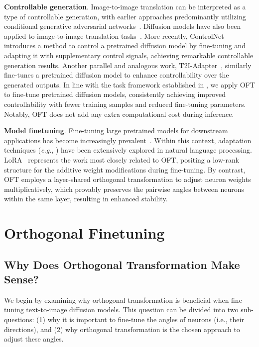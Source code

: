 \textbf{Controllable generation}. Image-to-image translation can be interpreted as a type of controllable generation, with earlier approaches predominantly utilizing conditional generative adversarial networks~\cite{isola2017image,zhu2017toward,wang2018high,park2019semantic,choi2018stargan}. Diffusion models have also been applied to image-to-image translation tasks~\cite{saharia2022palette,voynov2022sketch,wang2022pretraining}. More recently, ControlNet~\cite{zhang2023adding} introduces a method to control a pretrained diffusion model by fine-tuning and adapting it with supplementary control signals, achieving remarkable controllable generation results. Another parallel and analogous work, T2I-Adapter~\cite{mou2023t2i}, similarly fine-tunes a pretrained diffusion model to enhance controllability over the generated outputs. In line with the task framework established in \cite{zhang2023adding,mou2023t2i}, we apply OFT to fine-tune pretrained diffusion models, consistently achieving improved controllability with fewer training samples and reduced fine-tuning parameters. Notably, OFT does not add any extra computational cost during inference.

\textbf{Model finetuning}. Fine-tuning large pretrained models for downstream applications has become increasingly prevalent~\cite{devlin2018bert,brown2020language,he2022masked}. Within this context, adaptation techniques (\emph{e.g.}, \cite{hulora2022,houlsby2019parameter,pfeiffer2020adapterfusion}) have been extensively explored in natural language processing. LoRA~\cite{hulora2022} represents the work most closely related to OFT, positing a low-rank structure for the additive weight modifications during fine-tuning. By contrast, OFT employs a layer-shared orthogonal transformation to adjust neuron weights multiplicatively, which provably preserves the pairwise angles between neurons within the same layer, resulting in enhanced stability.

\section{Orthogonal Finetuning}

\subsection{Why Does Orthogonal Transformation Make Sense?}

We begin by examining why orthogonal transformation is beneficial when fine-tuning text-to-image diffusion models. This question can be divided into two sub-questions: (1) why it is important to fine-tune the angles of neurons (i.e., their directions), and (2) why orthogonal transformation is the chosen approach to adjust these angles.

